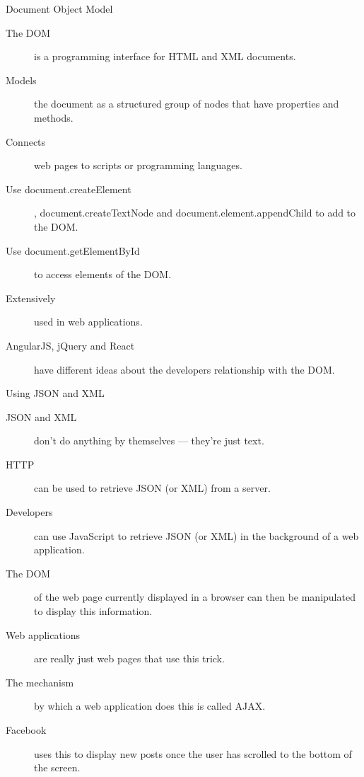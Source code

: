 \documentclass{beamer}
\begin{document}
\begin{frame}{Document Object Model}
  \begin{description}
    \item[The DOM] is a programming interface for HTML and XML documents.
    \item[Models] the document as a structured group of nodes that have properties and methods.
    \item[Connects] web pages to scripts or programming languages.
    \item[Use document.createElement], document.createTextNode and document.element.appendChild to add to the DOM.
    \item[Use document.getElementById] to access elements of the DOM.
    \item[Extensively] used in web applications.
    \item[AngularJS, jQuery and React] have different ideas about the developers relationship with the DOM.
  \end{description}
\end{frame}


\begin{frame}{Using JSON and XML}
  \begin{description}
    \item[JSON and XML] don't do anything by themselves --- they're just text.
    \item[HTTP] can be used to retrieve JSON (or XML) from a server.
    \item[Developers] can use JavaScript to retrieve JSON (or XML) in the background of a web application.
    \item[The DOM] of the web page currently displayed in a browser can then be manipulated to display this information.
    \item[Web applications] are really just web pages that use this trick.
    \item[The mechanism] by which a web application does this is called AJAX.
    \item[Facebook] uses this to display new posts once the user has scrolled to the bottom of the screen.
  \end{description}
\end{frame}
\end{document}
